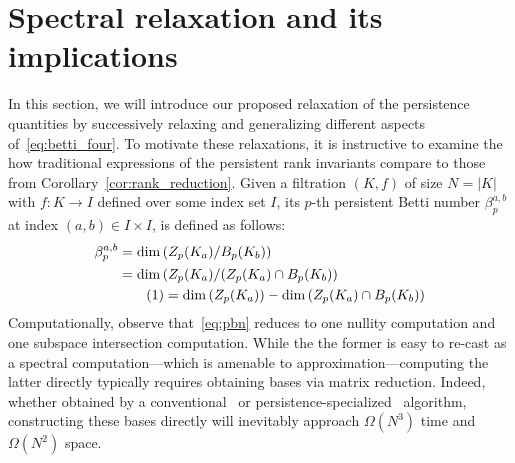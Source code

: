 \documentclass[10pt]{article}
\numberwithin{equation}{section}
\newcommand{\+}{%
	\raisebox{0.18ex}{\scaleobj{0.55}{+}}
}
\theoremstyle{definition}
\theoremstyle{definition}
\newcommand\numberthis{\addtocounter{equation}{1}\tag{\theequation}}
\begin{document}
\section{Spectral relaxation and its implications}\label{sec:spectral_sec}
In this section, we will introduce our proposed relaxation of the persistence quantities by successively relaxing and generalizing different aspects of~\eqref{eq:betti_four}. To motivate these relaxations, it is instructive to examine the how traditional expressions of the persistent rank invariants compare to  those from Corollary~\ref{cor:rank_reduction}. 
Given a filtration $(K,f)$ of size $N = \lvert K\rvert$ with $f: K \to I$ defined over some index set $I$, its $p$-th persistent Betti number $\beta_p^{a,b}$ at index $(a,b) \in I \times I$, is defined as follows: 
\begin{align*} \label{eq:pbn}
	\centering
	\beta_p^{a,b } &= \mathrm{dim} \left ( Z_p(K_a) / B_p(K_b) \right ) \\
	& = \mathrm{dim} \left( Z_p(K_a) / (Z_p(K_a) \cap B_p(K_b) \right) \\
	& \numberthis = \mathrm{dim} \left( Z_p(K_a) \right) - \mathrm{dim}\left( Z_p(K_a) \cap B_p(K_b) \right ) 
\end{align*}
Computationally, observe that~\eqref{eq:pbn} reduces to one nullity computation and one subspace intersection computation. %
While the the former is easy to re-cast as a spectral computation---which is amenable to approximation---computing the latter directly typically requires obtaining bases via matrix reduction. Indeed, whether obtained by a conventional~\cite{bhatia2013matrix, golub2013matrix} or persistence-specialized~\cite{memoli2022persistent, zomorodian2004computing} algorithm, constructing these bases directly will inevitably approach $\Omega(N^3)$ time and $\Omega(N^2)$ space.
\end{document}
